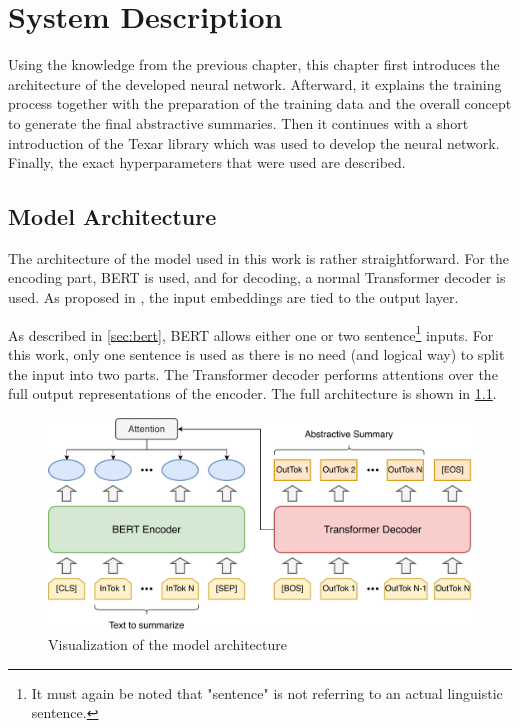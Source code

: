 \chapter{System Description}\label{ch:system-description}

Using the knowledge from the previous chapter, this chapter first introduces the architecture of the developed neural network.
Afterward, it explains the training process together with the preparation of the training data and the overall concept to generate the final abstractive summaries.
Then it continues with a short introduction of the Texar library \cite{hu2019texar} which was used to develop the neural network.
Finally, the exact hyperparameters that were used are described.


\section{Model Architecture}

The architecture of the model used in this work is rather straightforward.
For the encoding part, BERT is used, and for decoding, a normal Transformer decoder is used.
As proposed in \cite{1608.05859}, the input embeddings are tied to the output layer.

As described in \cref{sec:bert}, BERT allows either one or two sentence\footnote{It must again be noted that "sentence" is not referring to an actual linguistic sentence.} inputs.
For this work, only one sentence is used as there is no need (and logical way) to split the input into two parts.
The Transformer decoder performs attentions over the full output representations of the encoder.
The full architecture is shown in \cref{fig:summarization-architecture}.
 
\begin{figure}[h]
\centering
\includegraphics[width=0.7\paperwidth]{figures/summarization-architecture}
\caption{Visualization of the model architecture}
\label{fig:summarization-architecture}
\end{figure}

